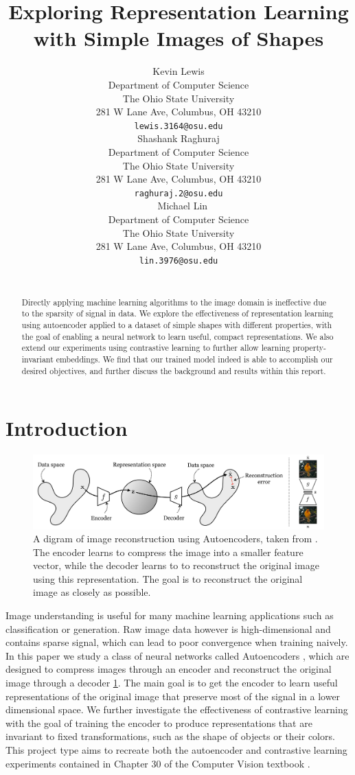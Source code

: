 \documentclass{article}
\title{Exploring Representation Learning with Simple Images of Shapes}
\author{%
  Kevin Lewis \\
  Department of Computer Science\\
  The Ohio State University\\
  281 W Lane Ave, Columbus, OH 43210 \\
  \texttt{lewis.3164@osu.edu} \\
  \And
  Shashank Raghuraj  \\
  Department of Computer Science\\
  The Ohio State University\\
  281 W Lane Ave, Columbus, OH 43210 \\
  \texttt{raghuraj.2@osu.edu} \\\
  \And
  Michael Lin  \\
  Department of Computer Science\\
  The Ohio State University\\
  281 W Lane Ave, Columbus, OH 43210 \\
  \texttt{lin.3976@osu.edu} \\\
}
\begin{document}
\maketitle

\begin{abstract}

Directly applying machine learning algorithms to the image domain is ineffective due to the sparsity of signal in data. We explore the effectiveness of representation learning using autoencoder applied to a dataset of simple shapes with different properties, with the goal of enabling a neural network to learn useful, compact representations. We also extend our experiments using contrastive learning to further allow learning property-invariant embeddings. We find that our trained model indeed is able to accomplish our desired objectives, and further discuss the background and results within this report.

\end{abstract}


\section{Introduction}

\begin{figure}[ht]
\centerline{\includegraphics[width=\columnwidth]{autoencoder.png}}
\caption{A digram of image reconstruction using Autoencoders, taken from \cite{foundationsCVbook}. The encoder learns to compress the image into a smaller feature vector, while the decoder learns to to reconstruct the original image using this representation. The goal is to reconstruct the original image as closely as possible.}\label{fig:autoencoder}
\end{figure} 

Image understanding is useful for many machine learning applications such as classification or generation. Raw image data however is high-dimensional and contains sparse signal, which can lead to poor convergence when training naively. In this paper we study a class of neural networks called Autoencoders \cite{foundationsCVbook}, which are designed to compress images through an encoder and reconstruct the original image through a decoder \ref{fig:autoencoder}. The main goal is to get the encoder to learn useful representations of the original image that preserve most of the signal in a lower dimensional space. We further investigate the effectiveness of contrastive learning \cite{foundationsCVbook} with the goal of training the encoder to produce representations that are invariant to fixed transformations, such as the shape of objects or their colors. This project type aims to recreate both the autoencoder and contrastive learning experiments contained in Chapter 30 of the Computer Vision textbook \cite{foundationsCVbook}.
\end{document}
